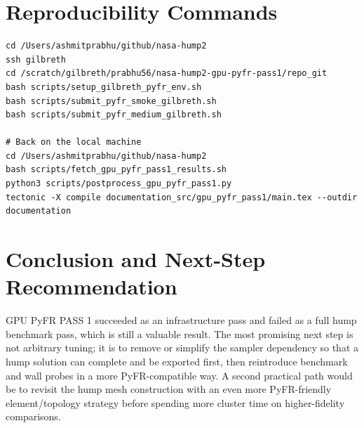 \documentclass[11pt]{article}
\begin{document}
\section{Reproducibility Commands}
\begin{lstlisting}[basicstyle=\ttfamily\small,breaklines=true]
cd /Users/ashmitprabhu/github/nasa-hump2
ssh gilbreth
cd /scratch/gilbreth/prabhu56/nasa-hump2-gpu-pyfr-pass1/repo_git
bash scripts/setup_gilbreth_pyfr_env.sh
bash scripts/submit_pyfr_smoke_gilbreth.sh
bash scripts/submit_pyfr_medium_gilbreth.sh

# Back on the local machine
cd /Users/ashmitprabhu/github/nasa-hump2
bash scripts/fetch_gpu_pyfr_pass1_results.sh
python3 scripts/postprocess_gpu_pyfr_pass1.py
tectonic -X compile documentation_src/gpu_pyfr_pass1/main.tex --outdir documentation
\end{lstlisting}

\section{Conclusion and Next-Step Recommendation}
GPU PyFR PASS 1 succeeded as an infrastructure pass and failed as a full hump benchmark pass, which is still a valuable result. The most promising next step is not arbitrary tuning; it is to remove or simplify the sampler dependency so that a hump solution can complete and be exported first, then reintroduce benchmark and wall probes in a more PyFR-compatible way. A second practical path would be to revisit the hump mesh construction with an even more PyFR-friendly element/topology strategy before spending more cluster time on higher-fidelity comparisons.



\end{document}
